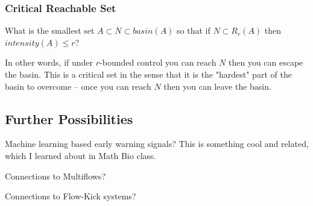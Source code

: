 \subsubsection{Critical Reachable Set}

What is the smallest set $A \subset N \subset basin(A)$ so that if $N \subset R_r(A)$ then $intensity(A) \leq r$?

In other words, if under $r$-bounded control you can reach $N$ then you can escape the basin. This is a critical set in the sense that it is the "hardest" part of the basin to overcome -- once you can reach $N$ then you can leave the basin. 

\subsection{Further Possibilities}

Machine learning based early warning signals? %
This is something cool and related, which I learned about in Math Bio class. 


Connections to Multiflows?

Connections to Flow-Kick systems? 

